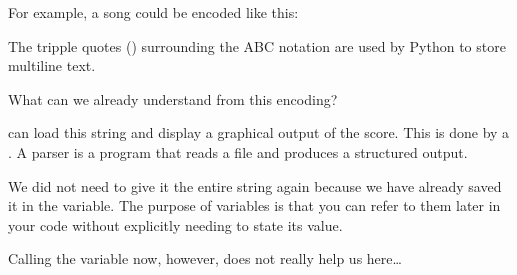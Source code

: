 \documentclass[letterpaper,10pt,english]{sphinxmanual}
\begin{document}
For example, a song could be encoded like this:

{
\begin{sphinxVerbatim}[commandchars=\\\{\}]
\llap{\color{nbsphinxin}[15]:\,\hspace{\fboxrule}\hspace{\fboxsep}}  
\end{sphinxVerbatim}
}

The tripple quotes () surrounding the ABC notation are used by Python to store multi\sphinxhyphen{}line text.

What can we already understand from this encoding?

 can load this string and display a graphical output of the score. This is done by a . A parser is a program that reads a file and produces a structured output.

{
\begin{sphinxVerbatim}[commandchars=\\\{\}]
\llap{\color{nbsphinxin}[16]:\,\hspace{\fboxrule}\hspace{\fboxsep}}  
\end{sphinxVerbatim}
}

We did not need to give it the entire string again because we have already saved it in the  variable. The purpose of variables is that you can refer to them later in your code without explicitly needing to state its value.

Calling the variable  now, however, does not really help us here…
\end{document}
